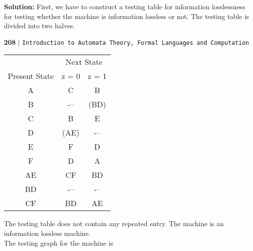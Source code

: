 \documentclass{article}
\begin{document}
\large{\textbf{Solution:}} \small{First, we have to construct a testing table for information losslessness for testing whether the machine is information lossless or not. The testing table is divided into two halves.}

\newpage
\begin{flushleft}
    \textbf{208}\hspace*{0.1cm} \textbf{$|$} \hspace*{0.1cm} {\small \texttt{Introduction to Automata Theory, Formal Languages and Computation}}
  \end{flushleft}
\vspace*{0.5cm}


\begin{center}
  \begin{tabular}{ccc}
\hline

\hline

\hline

\hline
 & \multicolumn{2}{c}{Next State}\\
 \cline{2-3}
Present State & z = 0 & z = 1\\
\hline
 A    &   C    &       B     \\
 B    &   -–   &      (BD)   \\
 C    &   B    &       E     \\
 D    &  (AE)  &       -–    \\
 E    &   F    &       D     \\
 F    &   D    &       A     \\
\hline
 AE   &   CF   &       BD     \\
 BD   &   -–   &       -–     \\
 CF   &   BD   &       AE     \\
\hline

\hline

\hline

\hline

  \end{tabular}
\end{center}

\hspace*{0.1cm} The testing table does not contain any repeated entry. The machine is an information lossless machine.\\

\hspace*{0.1cm} The testing graph for the machine is

\begin{center}
\end{center}
\end{document}
